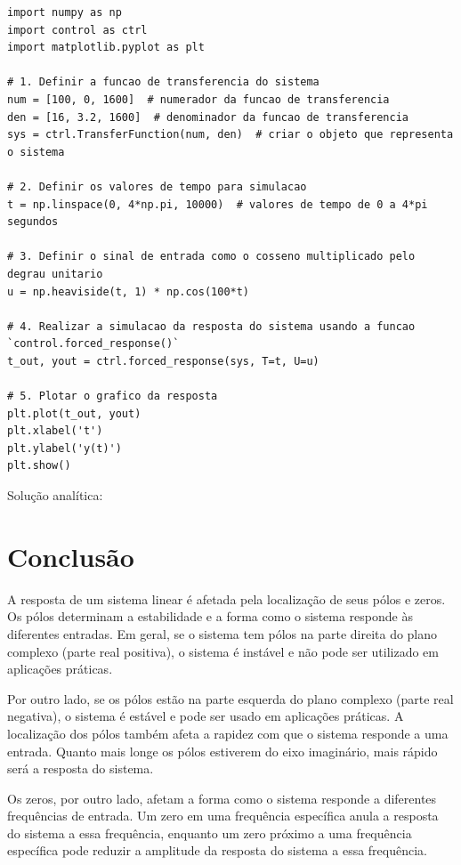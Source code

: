 \documentclass[10pt]{article}
\begin{document}
\begin{lstlisting}
import numpy as np
import control as ctrl
import matplotlib.pyplot as plt

# 1. Definir a funcao de transferencia do sistema
num = [100, 0, 1600]  # numerador da funcao de transferencia
den = [16, 3.2, 1600]  # denominador da funcao de transferencia
sys = ctrl.TransferFunction(num, den)  # criar o objeto que representa o sistema

# 2. Definir os valores de tempo para simulacao
t = np.linspace(0, 4*np.pi, 10000)  # valores de tempo de 0 a 4*pi segundos

# 3. Definir o sinal de entrada como o cosseno multiplicado pelo degrau unitario
u = np.heaviside(t, 1) * np.cos(100*t)

# 4. Realizar a simulacao da resposta do sistema usando a funcao `control.forced_response()`
t_out, yout = ctrl.forced_response(sys, T=t, U=u)

# 5. Plotar o grafico da resposta
plt.plot(t_out, yout)
plt.xlabel('t')
plt.ylabel('y(t)')
plt.show()
\end{lstlisting}

Solução analítica:

\newpage

\section{Conclusão}

\quad A resposta de um sistema linear é afetada pela localização de seus pólos e zeros.
Os pólos determinam a estabilidade e a forma como o sistema responde às diferentes entradas.
Em geral, se o sistema tem pólos na parte direita do plano complexo (parte real positiva), o sistema é instável e não pode ser utilizado em aplicações práticas.

\quad Por outro lado, se os pólos estão na parte esquerda do plano complexo (parte real negativa), o sistema é estável e pode ser usado em aplicações práticas.
A localização dos pólos também afeta a rapidez com que o sistema responde a uma entrada.
Quanto mais longe os pólos estiverem do eixo imaginário, mais rápido será a resposta do sistema.

\quad Os zeros, por outro lado, afetam a forma como o sistema responde a diferentes frequências de entrada.
Um zero em uma frequência específica anula a resposta do sistema a essa frequência,
enquanto um zero próximo a uma frequência específica pode reduzir a amplitude da resposta do sistema a essa frequência.
\end{document}
